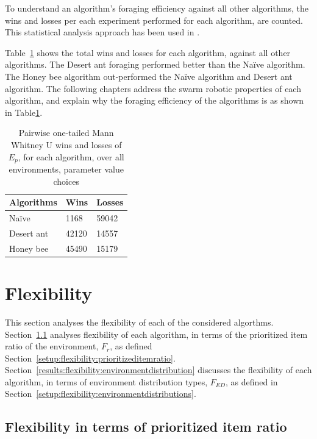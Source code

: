 To understand an algorithm's foraging efficiency against all other algorithms, the wins and losses per each experiment performed for each algorithm, are counted. This statistical analysis approach has been used in \cite{helbig2013performance}.

Table~\ref{summarytable} shows the total wins and losses for each algorithm, against all other algorithms. The Desert ant foraging performed better than the Na\"ive algorithm. The Honey bee algorithm out-performed the Na\"ive algorithm and Desert ant algorithm. The following chapters address the swarm robotic properties of each algorithm, and explain why the foraging efficiency of the algorithms is as shown in Table\ref{summarytable}.


\begin{table}[]
\centering
\caption{Pairwise one-tailed Mann Whitney U wins and losses of $E_p$, for each algorithm, over all environments, parameter value choices }
\label{summarytable}
\begin{tabular}{@{}lll@{}}
\toprule
\textbf{Algorithms} & \textbf{Wins} & \textbf{Losses} \\ \midrule
Na\"ive               & 1168          & 59042           \\
Desert ant          & 42120         & 14557           \\
Honey bee           & 45490         & 15179           \\ \bottomrule
\end{tabular}
\end{table}

\section{Flexibility}
\label{results:flexibility}

This section analyses the flexibility of each of the considered algorthms. Section~\ref{results:prioritizeditemratio} analyses flexibility of each algorithm, in terms of the prioritized item ratio of the environment, $F_r$, as defined Section~\ref{setup:flexibility:prioritizeditemratio}. Section~\ref{results:flexibility:environmentdistribution} discusses the flexibility of each algorithm, in terms of environment distribution types, $F_{ED}$, as defined in Section~\ref{setup:flexibility:environmentdistributions}.

\subsection{Flexibility in terms of prioritized item ratio}
\label{results:prioritizeditemratio}

